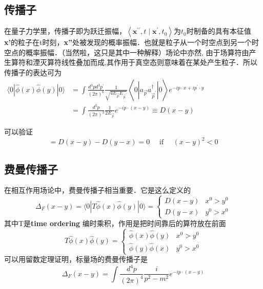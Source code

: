 \subsection{传播子}
在量子力学里，传播子即为跃迁振幅，$\left\langle\mathbf{x}^{\prime \prime}, t \mid \mathbf{x}^{\prime}, t_{0}\right\rangle$为$t_0$时制备的具有本征值\textbf{x'}的粒子在t时刻，\textbf{x''}处被发现的概率振幅．也就是粒子从一个时空点到另一个时空点的概率振幅．（当然啦，这只是其中一种解释）场论中亦然,
由于场算符由产生算符和湮灭算符线性叠加而成,其作用于真空态则意味着在某处产生粒子．所以传播子的表达可为
$\begin{aligned}\langle 0|\hat{\phi}(x) \hat{\phi}(y)| 0\rangle &=\int \frac{d^{3} p d^{3} p^{\prime}}{(2 \pi)^{6}} \frac{1}{\sqrt{4 E_{\vec{p}} E_{\vec{p}^{\prime}}}}\left\langle 0\left|a_{\vec{p}} a_{\vec{p}^{\prime}}^{\dagger}\right| 0\right\rangle e^{-i p \cdot x+i p^{\prime} \cdot y} \\ &=\int \frac{d^{3} p}{(2 \pi)^{3}} \frac{1}{2 E_{\vec{p}}} e^{-i p \cdot(x-y)} \equiv D(x-y) \end{aligned}$

可以验证
\begin{equation}
[\hat{\phi}(x), \hat{\phi}(y)]=D(x-y)-D(y-x)=0 \quad \text { if } \quad(x-y)^{2}<0
\end{equation}
\subsection{费曼传播子}
在相互作用场论中，费曼传播子相当重要．它是这么定义的
\begin{equation}
\Delta_{F}(x-y)=\langle 0|T \hat{\phi}(x) \hat{\phi}(y)| 0\rangle=\left\{\begin{array}{ll}
D(x-y) & x^{0}>y^{0} \\
D(y-x) & y^{0}>x^{0}
\end{array}\right.
\end{equation}
其中T是\textbf{time ordering} 编时乘积，作用是把时间靠后的算符放在前面
\begin{equation}
T \hat{\phi}(x) \hat{\phi}(y)=\left\{\begin{array}{ll}
\hat{\phi}(x) \hat{\phi}(y) & x^{0}>y^{0} \\
\hat{\phi}(y) \hat{\phi}(x) & y^{0}>x^{0}
\end{array}\right.
\end{equation}
可以用留数定理证明，标量场的费曼传播子是
\begin{equation}
\Delta_{F}(x-y)=\int \frac{d^{4} p}{(2 \pi)^{4}} \frac{i}{p^{2}-m^{2}} e^{-i p \cdot(x-y)}
\end{equation}
